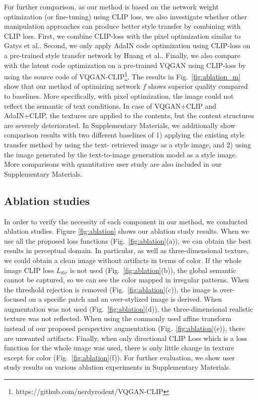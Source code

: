 \documentclass[10pt,twocolumn,letterpaper]{article}
\begin{document}
For further comparison, as our method is based on the network weight optimization (or fine-tuning) using CLIP loss, we also investigate whether other manipulation approaches can produce better style transfer by combining with CLIP loss.
First, we combine CLIP-loss with the pixel optimization similar to Gatys et al.\cite{gatys}. Second, we only apply AdaIN code optimization using CLIP-loss on a pre-trained style transfer network  by Huang et al.\cite{adain}. Finally, we also compare with the latent code optimization on a pre-trained VQGAN\cite{vqgan} using CLIP-loss by
using the source code of VQGAN-CLIP\footnote{https://github.com/nerdyrodent/VQGAN-CLIP}. The results in Fig.~\ref{fig:ablation_m} show that our method of optimizing network $f$ shows superior quality compared to baselines. More specifically, with pixel optimization, the image could not reflect the semantic of text conditions. In case of VQGAN+CLIP and AdaIN+CLIP, the textures are applied to the contents, but the content structures are severely deteriorated. {In Supplementary Materials, we additionally show comparison results with two different baselines of 1) applying the existing style transfer method by using the text-
retrieved image as a style image, and 2) using
the image generated by the text-to-image generation model
as a style image.}
More comparisons with quantitative user study are also included in our Supplementary Materials.



\subsection{Ablation studies}
In order to verify the necessity of each component in our method, we conducted ablation studies. Figure \ref{fig:ablation} shows our ablation study results. When we use all the proposed loss functions (Fig.~\ref{fig:ablation}(a)), we can obtain the best results in perceptual domain. In particular, as well as three-dimensional texture, we could obtain a clean image without artifacts in terms of color. If the whole image CLIP loss $L_{dir}$ is not used (Fig.~\ref{fig:ablation}(b)), the global semantic cannot be captured, so we can see the color mapped in irregular patterns.  When the threshold rejection is removed (Fig.~\ref{fig:ablation}(c)), the image is over-focused on a specific patch and an over-stylized image is derived. When augmentation was not used (Fig.~\ref{fig:ablation}(d)),  the three-dimensional realistic texture was not reflected.  When using the commonly used affine transform instead of our proposed perspective augmentation (Fig.~\ref{fig:ablation}(e)), there are unwanted artifacts. Finally, when only directional CLIP Loss which is a loss function for the whole image was used, there is only little change in texture except for color (Fig.~\ref{fig:ablation}(f)).  {For further evaluation, we show user study results on various ablation experiments in Supplementary Materials. }
\end{document}
